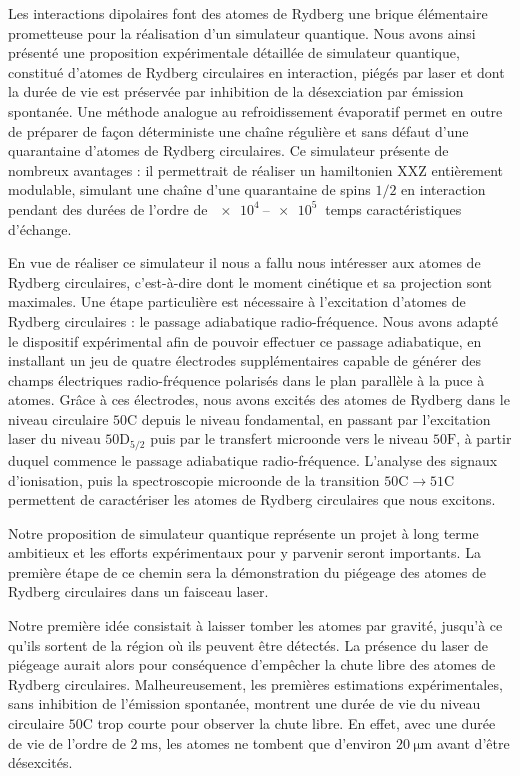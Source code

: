Les interactions dipolaires font des atomes de Rydberg une \og brique élémentaire \fg{} prometteuse pour la réalisation d'un simulateur quantique.
Nous avons ainsi présenté une proposition expérimentale détaillée de simulateur quantique, constitué d'atomes de Rydberg circulaires en interaction, piégés par laser et dont la durée de vie est préservée par inhibition de la désexciation par émission spontanée.
Une méthode analogue au refroidissement évaporatif permet en outre de préparer de façon déterministe une chaîne régulière et sans défaut d'une quarantaine d'atomes de Rydberg circulaires.
Ce simulateur présente de nombreux avantages : il permettrait de réaliser un hamiltonien $\mathrm{XXZ}$ entièrement modulable, simulant une chaîne d'une quarantaine de spins $1/2$ en interaction pendant des durées de l'ordre de $\SIrange{e4}{e5}{}$ temps caractéristiques d'échange.

En vue de réaliser ce simulateur il nous a fallu nous intéresser aux atomes de Rydberg circulaires, c'est-à-dire dont le moment cinétique et sa projection sont maximales.
Une étape particulière est nécessaire à l'excitation d'atomes de Rydberg circulaires : le passage adiabatique radio-fréquence.
Nous avons adapté le dispositif expérimental afin de pouvoir effectuer ce passage adiabatique, en installant un jeu de quatre électrodes supplémentaires capable de générer des champs électriques radio-fréquence polarisés dans le plan parallèle à la puce à atomes.
Grâce à ces électrodes, nous avons excités des atomes de Rydberg dans le niveau circulaire $\mathrm{50C}$ depuis le niveau fondamental, en passant par l'excitation laser du niveau $\mathrm{50D_{5/2}}$ puis par le transfert microonde vers le niveau $\mathrm{50F}$, à partir duquel commence le passage adiabatique radio-fréquence.
L'analyse des signaux d'ionisation, puis la spectroscopie microonde de la transition $\mathrm{50C \rightarrow 51C}$ permettent de caractériser les atomes de Rydberg circulaires que nous excitons.

\bigskip
Notre proposition de simulateur quantique représente un projet à long terme ambitieux et les efforts expérimentaux pour y parvenir seront importants.
La première étape de ce chemin sera la démonstration du piégeage des atomes de Rydberg circulaires dans un faisceau laser.

Notre première idée consistait à laisser tomber les atomes par gravité, jusqu'à ce qu'ils sortent de la région où ils peuvent être détectés.
La présence du laser de piégeage aurait alors pour conséquence d'empêcher la chute libre des atomes de Rydberg circulaires.
Malheureusement, les premières estimations expérimentales, sans inhibition de l'émission spontanée, montrent une durée de vie du niveau circulaire $\mathrm{50C}$ trop courte pour observer la chute libre.
En effet, avec une durée de vie de l'ordre de $\SI{2}{\ms}$, les atomes ne tombent que d'environ $\SI{20}{\um}$ avant d'être désexcités.

